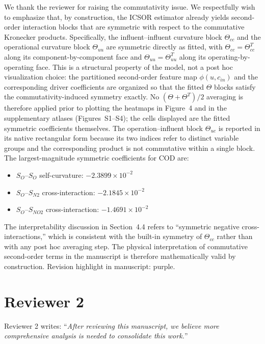 \documentclass[a4paper,11pt]{article}
\newcommand{\revhighlight}[2]{\textcolor{#1}{Revision highlight in manuscript: #2.}}
\begin{document}
We thank the reviewer for raising the commutativity issue. We respectfully wish to emphasize that, by construction, the ICSOR estimator already yields second-order interaction blocks that are symmetric with respect to the commutative Kronecker products. Specifically, the influent--influent curvature block $\Theta_{cc}$ and the operational curvature block $\Theta_{uu}$ are symmetric directly as fitted, with $\Theta_{cc} = \Theta_{cc}^T$ along its component-by-component face and $\Theta_{uu} = \Theta_{uu}^T$ along its operating-by-operating face. This is a structural property of the model, not a post hoc visualization choice: the partitioned second-order feature map $\phi(u, c_{in})$ and the corresponding driver coefficients are organized so that the fitted $\Theta$ blocks satisfy the commutativity-induced symmetry exactly. No $(\Theta + \Theta^T)/2$ averaging is therefore applied prior to plotting the heatmaps in Figure~4 and in the supplementary atlases (Figures~S1--S4); the cells displayed are the fitted symmetric coefficients themselves. The operation--influent block $\Theta_{uc}$ is reported in its native rectangular form because its two indices refer to distinct variable groups and the corresponding product is not commutative within a single block. The largest-magnitude symmetric coefficients for COD are:
\begin{itemize}[nosep]
\item $S_O$--$S_O$ self-curvature: $-2.3899 \times 10^{-2}$
\item $S_O$--$S_{N2}$ cross-interaction: $-2.1845 \times 10^{-2}$
\item $S_O$--$S_{NO2}$ cross-interaction: $-1.4691 \times 10^{-2}$
\end{itemize}
The interpretability discussion in Section~4.4 refers to ``symmetric negative cross-interactions,'' which is consistent with the built-in symmetry of $\Theta_{cc}$ rather than with any post hoc averaging step. The physical interpretation of commutative second-order terms in the manuscript is therefore mathematically valid by construction. \revhighlight{revRtwoOne}{purple}

\section*{Reviewer 2}

Reviewer 2 writes: ``\textit{After reviewing this manuscript, we believe more comprehensive analysis is needed to consolidate this work.}''
\end{document}
